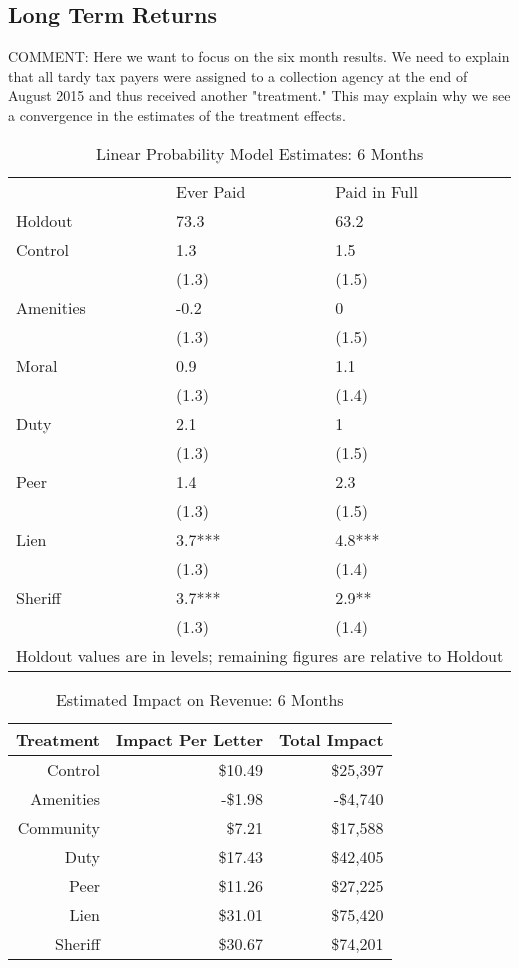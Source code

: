 \documentclass[12pt]{article}
\begin{document}
\newpage

\subsection{Long Term Returns}

COMMENT: Here we want to focus on the six month results. We need to explain that
all tardy tax payers were assigned to a collection agency at the end of August 2015 and
thus received another "treatment." This may explain why we see a convergence in the 
estimates of the treatment effects.

\begin{table}[ht]
\centering
\caption{Linear Probability Model Estimates: 6 Months} 
\label{tbl:marg_6mo}
\begin{tabular}{lll}
  \hline
   & Ever Paid & Paid in Full \\
Holdout & 73.3 & 63.2 \\ 
   \hline
Control & 1.3 & 1.5 \\ 
   & (1.3) & (1.5) \\ 
  Amenities & -0.2 & 0 \\ 
   & (1.3) & (1.5) \\ 
  Moral & 0.9 & 1.1 \\ 
   & (1.3) & (1.4) \\ 
  Duty & 2.1 & 1 \\ 
   & (1.3) & (1.5) \\ 
  Peer & 1.4 & 2.3 \\ 
   & (1.3) & (1.5) \\ 
  Lien & 3.7*** & 4.8*** \\ 
   & (1.3) & (1.4) \\ 
  Sheriff & 3.7*** & 2.9** \\ 
   & (1.3) & (1.4) \\ 
   
 \hline 
 \multicolumn{3}{l}{\scriptsize{Holdout values are in levels; remaining figures are relative to Holdout}} \\ 
\end{tabular}
\end{table}


\begin{table}[htbp]
\centering
\caption{Estimated Impact on Revenue: 6 Months} \label{pc_rev_6}
\begin{tabular}{rrr}
  \hline
Treatment & Impact Per Letter & Total Impact \\ 
  \hline
Control & \$10.49 & \$25,397 \\ 
  Amenities & -\$1.98 & -\$4,740 \\ 
  Community & \$7.21 & \$17,588 \\ 
  Duty & \$17.43 & \$42,405 \\ 
  Peer & \$11.26 & \$27,225 \\ 
  Lien & \$31.01 & \$75,420 \\ 
  Sheriff & \$30.67 & \$74,201 \\ 
   \hline
\end{tabular}
\end{table}
\end{document}
